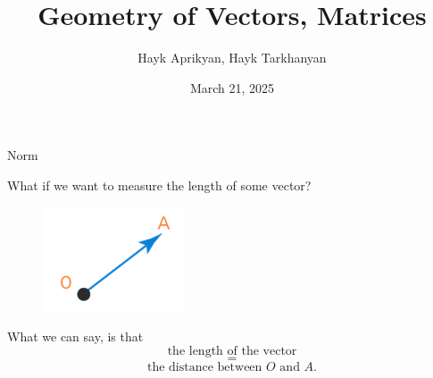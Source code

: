 \documentclass{beamer}
\title[Lecture 2]{Geometry of Vectors, Matrices}
\author[Aprikyan, Tarkhanyan]{Hayk Aprikyan, Hayk Tarkhanyan}
\institute[ACA]{Armenian Code Academy}
\date{March 21, 2025}
\begin{document}
\begin{frame}
  \titlepage
\end{frame}






\begin{frame}{Norm}

  What if we want to measure the length of some vector?
\begin{figure}
    \includegraphics[width=0.25\linewidth]{vector.png}
\end{figure}

\pause 

What we can say, is that 
\[\text{the length of the vector}\]
\[=\]
\[\text{the distance between } O \text{ and } A.\]
  
\end{frame}
\end{document}
